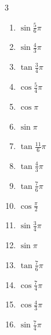 \begin{multicols}{3}
\begin{enumerate}
  \item $\displaystyle \sin{\frac{5}{6}\pi}$

  \item $\displaystyle \sin{\frac{4}{3}\pi}$

  \item $\displaystyle \tan{\frac{3}{4}\pi}$
        \phantom{$\displaystyle =-1$}

  \item $\displaystyle \cos{\frac{5}{4}\pi}$

  \item $\displaystyle \cos{\pi}$
        \phantom{$\displaystyle =-1$}

  \item $\displaystyle \sin{\pi}$
        \phantom{$\displaystyle =0$}

  \item $\displaystyle \tan{\frac{11}{6}\pi}$

  \item $\displaystyle \tan{\frac{4}{3}\pi}$

  \item $\displaystyle \tan{\frac{7}{6}\pi}$

  \item $\displaystyle \cos{\frac{\pi}{2}}$
        \phantom{$\displaystyle =0$}

  \item $\displaystyle \sin{\frac{3}{4}\pi}$

  \item $\displaystyle \sin{\pi}$
        \phantom{$\displaystyle =0$}

  \item $\displaystyle \tan{\frac{7}{6}\pi}$

  \item $\displaystyle \cos{\frac{7}{4}\pi}$

  \item $\displaystyle \cos{\frac{4}{3}\pi}$

  \item $\displaystyle \sin{\frac{7}{4}\pi}$


\end{enumerate}
\end{multicols}
